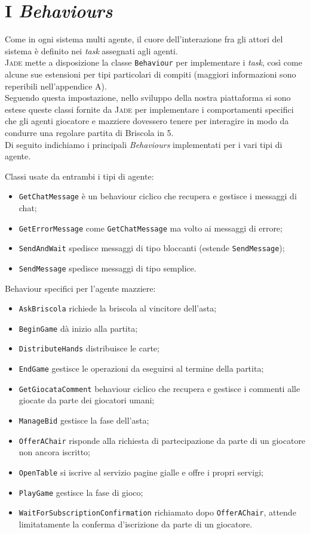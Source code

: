 \section{I \emph{Behaviours}}

Come in ogni sistema multi agente, il cuore dell'interazione fra gli attori del sistema è definito nei \emph{task} assegnati agli agenti.\\
\textsc{Jade} mette a disposizione la classe \texttt{Behaviour} per implementare i \emph{task}, così come alcune sue estensioni per tipi particolari di compiti (maggiori informazioni sono reperibili nell'appendice A).\\
Seguendo questa impostazione, nello sviluppo della nostra piattaforma si sono estese queste classi fornite da \textsc{Jade} per implementare i comportamenti specifici che gli agenti giocatore e mazziere dovessero tenere per interagire in modo da condurre una regolare partita di Briscola in 5.\\
Di seguito indichiamo i principali \emph{Behaviours} implementati per i vari tipi di agente.

Classi usate da entrambi i tipi di agente:
\begin{itemize}
   \item \texttt{GetChatMessage} è un behaviour ciclico che recupera e gestisce i messaggi di chat;
   \item \texttt{GetErrorMessage} come \texttt{GetChatMessage} ma volto ai messaggi di errore;
   \item \texttt{SendAndWait} spedisce messaggi di tipo bloccanti (estende \texttt{SendMessage});
   \item \texttt{SendMessage} spedisce messaggi di tipo semplice.
\end{itemize}

Behaviour specifici per l'agente mazziere:

\begin{itemize}
   \item \texttt{AskBriscola} richiede la briscola al vincitore dell'asta;
   \item \texttt{BeginGame} dà inizio alla partita;
   \item \texttt{DistributeHands} distribuisce le carte;
   \item \texttt{EndGame} gestisce le operazioni da eseguirsi al termine della partita;
   \item \texttt{GetGiocataComment} behaviour ciclico che recupera e gestisce i commenti alle giocate da parte dei giocatori umani;
   \item \texttt{ManageBid} gestisce la fase dell'asta;
   \item \texttt{OfferAChair} risponde alla richiesta di partecipazione da parte di un giocatore non ancora iscritto;
   \item \texttt{OpenTable} si iscrive al servizio pagine gialle e offre i propri servigi;
   \item \texttt{PlayGame} gestisce la fase di gioco;
   \item \texttt{WaitForSubscriptionConfirmation} richiamato dopo \texttt{OfferAChair}, attende limitatamente la conferma d'iscrizione da parte di un giocatore.
\end{itemize}

